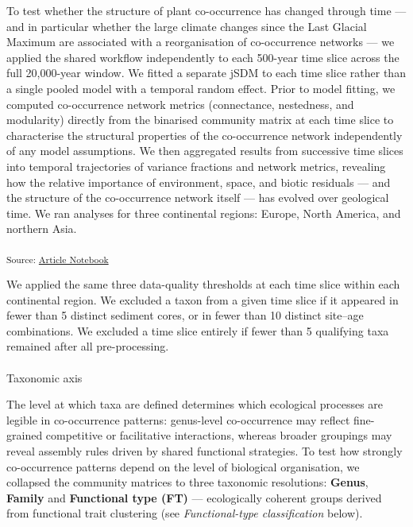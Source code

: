 \documentclass[
  12pt,
]{article}
\makeatletter
\let\oldparagraph\paragraph
\renewcommand{\paragraph}{
    \@ifstar
      \xxxParagraphStar
      \xxxParagraphNoStar
  }
\newcommand{\xxxParagraphStar}[1]{\oldparagraph*{#1}\mbox{}}
\newcommand{\xxxParagraphNoStar}[1]{\oldparagraph{#1}\mbox{}}
\makeatother
\begin{document}
To test whether the structure of plant co-occurrence has changed through
time --- and in particular whether the large climate changes since the
Last Glacial Maximum are associated with a reorganisation of
co-occurrence networks --- we applied the shared workflow independently
to each 500-year time slice across the full 20,000-year window. We
fitted a separate jSDM to each time slice rather than a single pooled
model with a temporal random effect. Prior to model fitting, we computed
co-occurrence network metrics (connectance, nestedness, and modularity)
directly from the binarised community matrix at each time slice to
characterise the structural properties of the co-occurrence network
independently of any model assumptions. We then aggregated results from
successive time slices into temporal trajectories of variance fractions
and network metrics, revealing how the relative importance of
environment, space, and biotic residuals --- and the structure of the
co-occurrence network itself --- has evolved over geological time. We
ran analyses for three continental regions: Europe, North America, and
northern Asia.

\textsubscript{Source:
\href{https://OndrejMottl.github.io/BIODYNAMICS-vegetation-cooccurrence/manuscript.qmd.html}{Article
Notebook}}

We applied the same three data-quality thresholds at each time slice
within each continental region. We excluded a taxon from a given time
slice if it appeared in fewer than 5 distinct sediment cores, or in
fewer than 10 distinct site--age combinations. We excluded a time slice
entirely if fewer than 5 qualifying taxa remained after all
pre-processing.

\paragraph{Taxonomic axis}\label{taxonomic-axis}

The level at which taxa are defined determines which ecological
processes are legible in co-occurrence patterns: genus-level
co-occurrence may reflect fine-grained competitive or facilitative
interactions, whereas broader groupings may reveal assembly rules driven
by shared functional strategies. To test how strongly co-occurrence
patterns depend on the level of biological organisation, we collapsed
the community matrices to three taxonomic resolutions: \textbf{Genus},
\textbf{Family} and \textbf{Functional type (FT)} --- ecologically
coherent groups derived from functional trait clustering (see
\emph{Functional-type classification} below).
\end{document}
